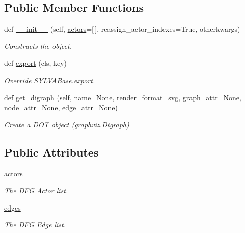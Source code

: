 \subsection*{Public Member Functions}
\begin{DoxyCompactItemize}
\item 
def \hyperlink{classsylva_1_1base_1_1sdf_1_1_d_f_g_af005a65a522091fe22d2536bb16d1cf2}{\+\_\+\+\_\+init\+\_\+\+\_\+} (self, \hyperlink{classsylva_1_1base_1_1sdf_1_1_d_f_g_a3e404cf1c5b21b46817a26520a03aa3a}{actors}=\mbox{[}$\,$\mbox{]}, reassign\+\_\+actor\+\_\+indexes=True, otherkwargs)
\begin{DoxyCompactList}\small\item\em Constructs the object. \end{DoxyCompactList}\item 
def \hyperlink{classsylva_1_1base_1_1sdf_1_1_d_f_g_ab66178c50a2d998a7cd92190173b4450}{export} (cls, key)
\begin{DoxyCompactList}\small\item\em Override S\+Y\+L\+V\+A\+Base.\+export. \end{DoxyCompactList}\item 
def \hyperlink{classsylva_1_1base_1_1sdf_1_1_d_f_g_ab910b4ff0e171dcc46ea65cf790699cc}{get\+\_\+digraph} (self, name=None, render\+\_\+format=\textquotesingle{}svg\textquotesingle{}, graph\+\_\+attr=None, node\+\_\+attr=None, edge\+\_\+attr=None)
\begin{DoxyCompactList}\small\item\em Create a D\+OT object (graphviz.\+Digraph) \end{DoxyCompactList}\end{DoxyCompactItemize}
\subsection*{Public Attributes}
\begin{DoxyCompactItemize}
\item 
\hyperlink{classsylva_1_1base_1_1sdf_1_1_d_f_g_a3e404cf1c5b21b46817a26520a03aa3a}{actors}
\begin{DoxyCompactList}\small\item\em The \hyperlink{classsylva_1_1base_1_1sdf_1_1_d_f_g}{D\+FG} \hyperlink{classsylva_1_1base_1_1sdf_1_1_actor}{Actor} list. \end{DoxyCompactList}\item 
\hyperlink{classsylva_1_1base_1_1sdf_1_1_d_f_g_a565dfad69749ebe807f3db745fffe50d}{edges}
\begin{DoxyCompactList}\small\item\em The \hyperlink{classsylva_1_1base_1_1sdf_1_1_d_f_g}{D\+FG} \hyperlink{classsylva_1_1base_1_1sdf_1_1_edge}{Edge} list. \end{DoxyCompactList}\end{DoxyCompactItemize}
